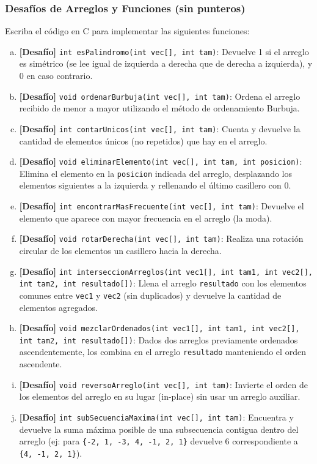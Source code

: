 \begin{ejercicioClase}
    \subsubsection{Desafíos de Arreglos y Funciones (sin punteros)}
    Escriba el código en C para implementar las siguientes funciones:
    \begin{enumerate}[a)]
        \item \textbf{[Desafío]} \texttt{int esPalindromo(int vec[], int tam)}: Devuelve 1 si el arreglo es simétrico (se lee igual de izquierda a derecha que de derecha a izquierda), y 0 en caso contrario.
        \item \textbf{[Desafío]} \texttt{void ordenarBurbuja(int vec[], int tam)}: Ordena el arreglo recibido de menor a mayor utilizando el método de ordenamiento Burbuja.
        \item \textbf{[Desafío]} \texttt{int contarUnicos(int vec[], int tam)}: Cuenta y devuelve la cantidad de elementos únicos (no repetidos) que hay en el arreglo.
        \item \textbf{[Desafío]} \texttt{void eliminarElemento(int vec[], int tam, int posicion)}: Elimina el elemento en la \texttt{posicion} indicada del arreglo, desplazando los elementos siguientes a la izquierda y rellenando el último casillero con 0.
        \item \textbf{[Desafío]} \texttt{int encontrarMasFrecuente(int vec[], int tam)}: Devuelve el elemento que aparece con mayor frecuencia en el arreglo (la moda).
        \item \textbf{[Desafío]} \texttt{void rotarDerecha(int vec[], int tam)}: Realiza una rotación circular de los elementos un casillero hacia la derecha.
        \item \textbf{[Desafío]} \texttt{int interseccionArreglos(int vec1[], int tam1, int vec2[], int tam2, int resultado[])}: Llena el arreglo \texttt{resultado} con los elementos comunes entre \texttt{vec1} y \texttt{vec2} (sin duplicados) y devuelve la cantidad de elementos agregados.
        \item \textbf{[Desafío]} \texttt{void mezclarOrdenados(int vec1[], int tam1, int vec2[], int tam2, int resultado[])}: Dados dos arreglos previamente ordenados ascendentemente, los combina en el arreglo \texttt{resultado} manteniendo el orden ascendente.
        \item \textbf{[Desafío]} \texttt{void reversoArreglo(int vec[], int tam)}: Invierte el orden de los elementos del arreglo en su lugar (in-place) sin usar un arreglo auxiliar.
        \item \textbf{[Desafío]} \texttt{int subSecuenciaMaxima(int vec[], int tam)}: Encuentra y devuelve la suma máxima posible de una subsecuencia contigua dentro del arreglo (ej: para \texttt{\{-2, 1, -3, 4, -1, 2, 1\}} devuelve 6 correspondiente a \texttt{\{4, -1, 2, 1\}}).
    \end{enumerate}


\end{ejercicioClase}
